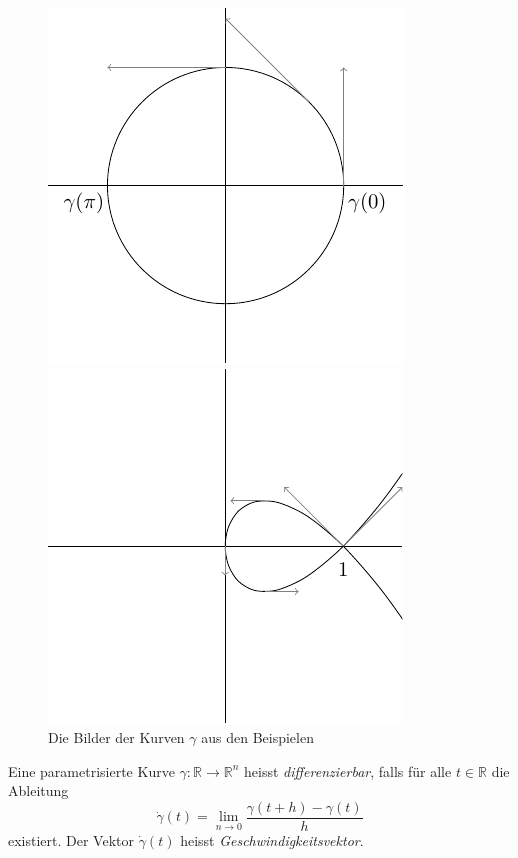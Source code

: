\documentclass[../main.tex]{subfiles}
\begin{document}
\begin{figure}[htb] 
  \centering
  \begin{minipage}{0.50\textwidth}
    \centering
    \includegraphics{figures/circlecurve}
  \end{minipage}%
  \begin{minipage}{0.50\textwidth}
    \centering
    \includegraphics{figures/butterflycurve}
  \end{minipage}%
  \caption{Die Bilder der Kurven $\gamma$ 
  aus den Beispielen}%
  \label{fig:parametrisations}
\end{figure}

\begin{definition}
  Eine parametrisierte Kurve $\gamma \colon \mathbb{R} \to \mathbb{R}^n$ 
  heisst \emph{differenzierbar}, falls für alle $t \in \mathbb{R}$ 
  die Ableitung
  \[
    \dot{\gamma}(t) = \lim_{n \to 0} \frac{ \gamma(t + h) - \gamma(t)}{h}
  \]
  existiert.
  Der Vektor $\dot{\gamma}(t)$ heisst \emph{Geschwindigkeitsvektor}.
\end{definition}
\end{document}
